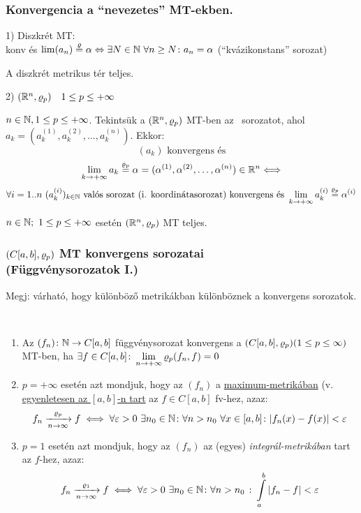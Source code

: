 \subsubsection{Konvergencia a ``nevezetes'' MT-ekben.}

1) Diszkrét MT: \MT\\
\sorozat konv és $\lim(a_n)\stackrel{\varrho}{=}\alpha \Leftrightarrow \exists
N\in\mathbb{N} \ \forall n\geq N\colon a_n=\alpha $ (``kvázikonstans''
sorozat)


\begin{te}
  A diszkrét metrikus tér teljes.
\end{te}


2) $(\mathbb{R}^n,\varrho_p)\quad 1\leq p\leq+\infty$

\begin{te}
  $n\in\mathbb{N},1\leq p\leq+\infty$. Tekintsük a $(\mathbb{R}^n,\varrho_p)$ MT-ben az
  \ sorozatot, ahol
  $a_k=(a_k^{(1)},a_k^{(2)},\ldots,a_k^{(n)})$. Ekkor:
  \[(a_k) \text{ konvergens és}\]
  \[\displaystyle\lim_{k\to+\infty}a_k\stackrel{\varrho_p}{=}\alpha =
  (\alpha^{(1)},\alpha^{(2)},\ldots,\alpha^{(n)})\in\mathbb{R}^n
  \Longleftrightarrow\]
  \[\forall i=1..n\ (a_k^{(i)})_{k\in\mathbb{N}}
  \text{ valós sorozat (i. koordinátasorozat) konvergens és
  } \lim_{k\to+\infty}a_k^{(i)}\stackrel{\varrho_p}{=}\alpha^{(i)}\]
\end{te}


\begin{te}
  $n\in\mathbb{N};\ 1\leq p\leq +\infty$ esetén $(\mathbb{R}^n,\varrho_p)$ MT teljes.
\end{te}

\subsubsection[Konvergens függvénysorozatok]{$(C[a,b],\varrho_p)$ MT
  konvergens  sorozatai\\ (Függvénysorozatok I.)}
Megj: várható, hogy különböző metrikákban különböznek a konvergens
sorozatok.
\begin{de}\ 
  \begin{enumerate}[\quad(a)]
  \item Az $(f_n)\colon \mathbb{N}\to C[a,b]$ függvénysorozat konvergens a
    $(C[a,b],\varrho_p)\\(1\leq p\leq\infty)$ MT-ben, ha  $\exists f\in
    \displaystyle C[a,b]\colon \lim_{n\to+\infty}\varrho_p(f_n,f)=0$
  \item $p=+\infty$ esetén azt mondjuk, hogy az $(f_n)$ a
    \underline{maximum-metrikában} (v. \underline{egyenletesen az }
    \underline{$[a,b]$-n tart} az $f\in C[a,b]$ fv-hez, azaz:\\
    \[f_n \xrightarrow[n\to\infty]{\varrho_p} f \iff \forall\varepsilon>0\
    \exists n_0\in\mathbb{N}\colon \forall n>n_0\  \forall  x\in[a,b]\colon
    |f_n(x)-f(x)| < \varepsilon\]
  \item $p=1$ esetén azt mondjuk, hogy az $(f_n)$ az (egyes)
    \emph{integrál-metrikában} tart az $f$-hez, azaz:
    \[f_n \xrightarrow[n\to\infty]{\varrho_1} f \iff \forall\varepsilon>0\
    \exists n_0\in\mathbb{N}\colon \forall n>n_0\ \colon \displaystyle\int\limits_a^b
    |f_n-f| < \varepsilon\]

  \end{enumerate} 
\end{de}


